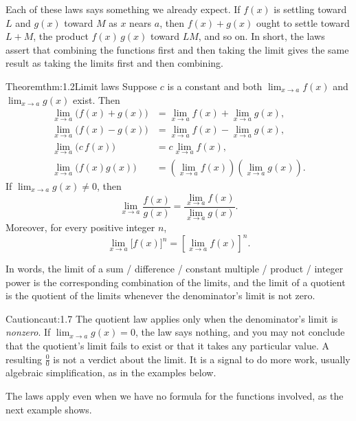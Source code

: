 \documentclass[a4paper,12pt,oneside]{memoir}
\begin{document}
Each of these laws says something we already expect. If \(f(x)\) is settling toward \(L\) and \(g(x)\) toward \(M\) as \(x\) nears \(a\), then \(f(x) + g(x)\) ought to settle toward \(L + M\), the product \(f(x)\,g(x)\) toward \(LM\), and so on. In short, the laws assert that combining the functions first and then taking the limit gives the same result as taking the limits first and then combining.

\begin{envtheorem}{Theorem}{thm:1.2}{Limit laws}
Suppose \(c\) is a constant and both \(\lim_{x \to a} f(x)\) and \(\lim_{x \to a} g(x)\) exist. Then \[ \begin{aligned} \lim_{x \to a}\bigl(f(x) + g(x)\bigr) &= \lim_{x \to a} f(x) + \lim_{x \to a} g(x),\\ \lim_{x \to a}\bigl(f(x) - g(x)\bigr) &= \lim_{x \to a} f(x) - \lim_{x \to a} g(x),\\ \lim_{x \to a}\bigl(c \, f(x)\bigr) &= c \lim_{x \to a} f(x),\\ \lim_{x \to a}\bigl(f(x) g(x)\bigr) &= \left(\lim_{x \to a} f(x)\right)\!\left(\lim_{x \to a} g(x)\right). \end{aligned} \] If \(\lim_{x \to a} g(x) \neq 0\), then \[ \lim_{x \to a} \frac{f(x)}{g(x)} = \frac{\lim_{x \to a} f(x)}{\lim_{x \to a} g(x)}. \] Moreover, for every positive integer \(n\), \[ \lim_{x \to a} \bigl[f(x)\bigr]^{n} = \left[\lim_{x \to a} f(x)\right]^{n}. \]
\end{envtheorem}
In words, the limit of a sum / difference / constant multiple / product / integer power is the corresponding combination of the limits, and the limit of a quotient is the quotient of the limits whenever the denominator’s limit is not zero.

\begin{envcaution}{Caution}{caut:1.7}{}
The quotient law applies only when the denominator’s limit is \emph{nonzero}. If \(\lim_{x \to a} g(x) = 0\), the law says nothing, and you may not conclude that the quotient’s limit fails to exist or that it takes any particular value. A resulting \(\tfrac{0}{0}\) is not a verdict about the limit. It is a signal to do more work, usually algebraic simplification, as in the examples below.
\end{envcaution}
The laws apply even when we have no formula for the functions involved, as the next example shows.
\end{document}
